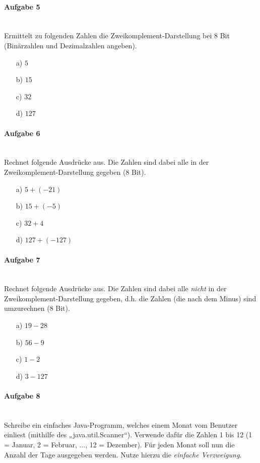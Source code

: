\documentclass[12pt,a4paper,ngerman]{scrartcl}
\begin{document}
	\paragraph{Aufgabe 5}\mbox{}\\
	Ermittelt zu folgenden Zahlen die Zweikomplement-Darstellung bei 8 Bit (Binärzahlen und Dezimalzahlen angeben).
	\begin{itemize}
		\item[a)] $5$
		\item[b)] $15$
		\item[c)] $32$
		\item[d)] $127$
	\end{itemize}

	\paragraph{Aufgabe 6}\mbox{}\\
	Rechnet folgende Ausdrücke aus. Die Zahlen sind dabei alle in der Zweikomplement-Darstellung gegeben (8 Bit).
	\begin{itemize}
		\item[a)] $5 + (-21)$
		\item[b)] $15 + (-5)$
		\item[c)] $32 + 4$
		\item[d)] $127 + (-127)$
	\end{itemize}
	
	\paragraph{Aufgabe 7}\mbox{}\\
	Rechnet folgende Ausdrücke aus. Die Zahlen sind dabei alle \emph{nicht} in der Zweikomplement-Darstellung gegeben, d.h. die Zahlen (die nach dem Minus) sind umzurechnen (8 Bit).
	\begin{itemize}
		\item[a)] $19 - 28$
		\item[b)] $56 - 9$
		\item[c)] $1 - 2$
		\item[d)] $3 - 127$
	\end{itemize}
	
	\paragraph{Aufgabe 8}\mbox{}\\
	Schreibe ein einfaches Java-Programm, welches einem Monat vom Benutzer einliest (mithilfe des „java.util.Scanner“).
	Verwende dafür die Zahlen 1 bis 12 (1 = Januar, 2 = Februar, ..., 12 = Dezember). Für jeden Monat soll nun die Anzahl der Tage ausgegeben werden.
	Nutze hierzu die \emph{einfache Verzweigung}.
	
\end{document}
